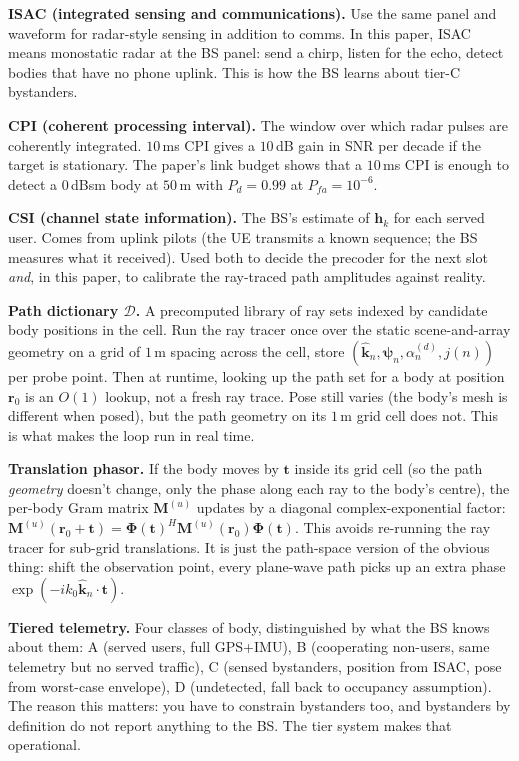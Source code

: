 \documentclass[11pt]{article}
\newenvironment{defs}[1][]{%
  \begin{mdframed}[backgroundcolor=blue!4,linecolor=blue!40!black,
    linewidth=0.4pt,roundcorner=2pt,innertopmargin=8pt,
    innerbottommargin=8pt,innerleftmargin=10pt,innerrightmargin=10pt,
    frametitle={\textbf{#1}},frametitlebackgroundcolor=blue!10]%
}{\end{mdframed}}
\newcommand{\khat}{\hat{\bm{k}}}
\newcommand{\rr}{\mathbf{r}}
\newcommand{\hh}{\mathbf{h}}
\newcommand{\Mmat}{\mathbf{M}}
\newcommand{\Phimat}{\mathbf{\Phi}}
\begin{document}
\begin{defs}[Architecture terms]
\textbf{ISAC (integrated sensing and communications).} Use the same
panel and waveform for radar-style sensing in addition to comms. In
this paper, ISAC means monostatic radar at the BS panel: send a
chirp, listen for the echo, detect bodies that have no phone uplink.
This is how the BS learns about tier-C bystanders.

\textbf{CPI (coherent processing interval).} The window over which
radar pulses are coherently integrated. $10\,$ms CPI gives a $10\,$dB
gain in SNR per decade if the target is stationary. The paper's link
budget shows that a $10\,$ms CPI is enough to detect a $0\,$dBsm body
at $50\,$m with $P_d = 0.99$ at $P_{fa} = 10^{-6}$.

\textbf{CSI (channel state information).} The BS's estimate of $\hh_k$
for each served user. Comes from uplink pilots (the UE transmits a known
sequence; the BS measures what it received). Used both to decide the
precoder for the next slot \emph{and}, in this paper, to calibrate the
ray-traced path amplitudes against reality.

\textbf{Path dictionary $\mathcal{D}$.} A precomputed library of ray
sets indexed by candidate body positions in the cell. Run the ray
tracer once over the static scene-and-array geometry on a grid of
$1\,$m spacing across the cell, store $(\khat_n, \bm\psi_n,
\alpha_n^{(d)}, j(n))$ per probe point. Then at runtime, looking up
the path set for a body at position $\rr_0$ is an $O(1)$ lookup, not
a fresh ray trace. Pose still varies (the body's mesh is different
when posed), but the path geometry on its $1\,$m grid cell does not.
This is what makes the loop run in real time.

\textbf{Translation phasor.} If the body moves by $\mathbf{t}$ inside
its grid cell (so the path \emph{geometry} doesn't change, only the
phase along each ray to the body's centre), the per-body Gram matrix
$\Mmat^{(u)}$ updates by a diagonal complex-exponential factor:
$\Mmat^{(u)}(\rr_0 + \mathbf{t}) = \Phimat(\mathbf{t})^H
\Mmat^{(u)}(\rr_0) \Phimat(\mathbf{t})$. This avoids re-running the
ray tracer for sub-grid translations. It is just the path-space
version of the obvious thing: shift the observation point, every
plane-wave path picks up an extra phase $\exp(-i k_0 \khat_n \cdot
\mathbf{t})$.

\textbf{Tiered telemetry.} Four classes of body, distinguished by what
the BS knows about them: A (served users, full GPS+IMU), B (cooperating
non-users, same telemetry but no served traffic), C (sensed bystanders,
position from ISAC, pose from worst-case envelope), D (undetected,
fall back to occupancy assumption). The reason this matters: you have
to constrain bystanders too, and bystanders by definition do not
report anything to the BS. The tier system makes that operational.
\end{defs}
\end{document}
